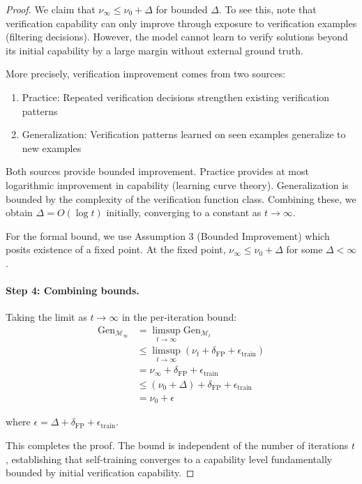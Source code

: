 \documentclass{article}
\theoremstyle{definition}
\theoremstyle{remark}
\newcommand{\M}{\mathcal{M}}
\newcommand{\Gen}{\text{Gen}}
\begin{document}
\begin{proof}
We claim that \(\nu_\infty \leq \nu_0 + \Delta\) for bounded \(\Delta\). To see this, note that verification capability can only improve through exposure to verification examples (filtering decisions). However, the model cannot learn to verify solutions beyond its initial capability by a large margin without external ground truth.

More precisely, verification improvement comes from two sources:
\begin{enumerate}
\item Practice: Repeated verification decisions strengthen existing verification patterns
\item Generalization: Verification patterns learned on seen examples generalize to new examples
\end{enumerate}

Both sources provide bounded improvement. Practice provides at most logarithmic improvement in capability (learning curve theory). Generalization is bounded by the complexity of the verification function class. Combining these, we obtain \(\Delta = O(\log t)\) initially, converging to a constant as \(t \to \infty\).

For the formal bound, we use Assumption 3 (Bounded Improvement) which posits existence of a fixed point. At the fixed point, \(\nu_\infty \leq \nu_0 + \Delta\) for some \(\Delta < \infty\).

\paragraph{Step 4: Combining bounds.}
Taking the limit as \(t \to \infty\) in the per-iteration bound:
\begin{align*}
\Gen_{\M_\infty} &= \limsup_{t \to \infty} \Gen_{\M_t} \\
&\leq \limsup_{t \to \infty} (\nu_t + \delta_{\text{FP}} + \epsilon_{\text{train}}) \\
&= \nu_\infty + \delta_{\text{FP}} + \epsilon_{\text{train}} \\
&\leq (\nu_0 + \Delta) + \delta_{\text{FP}} + \epsilon_{\text{train}} \\
&= \nu_0 + \epsilon
\end{align*}

where \(\epsilon = \Delta + \delta_{\text{FP}} + \epsilon_{\text{train}}\).

This completes the proof. The bound is independent of the number of iterations \(t\), establishing that self-training converges to a capability level fundamentally bounded by initial verification capability.
\end{proof}
\end{document}
